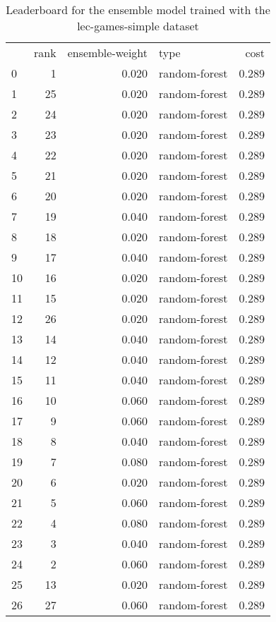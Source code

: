 \begin{table}[]
	\centering
	\begin{tabular}{lrrlr}
		   & rank & ensemble-weight & type          & cost  \\
		0  & 1    & 0.020           & random-forest & 0.289 \\
		1  & 25   & 0.020           & random-forest & 0.289 \\
		2  & 24   & 0.020           & random-forest & 0.289 \\
		3  & 23   & 0.020           & random-forest & 0.289 \\
		4  & 22   & 0.020           & random-forest & 0.289 \\
		5  & 21   & 0.020           & random-forest & 0.289 \\
		6  & 20   & 0.020           & random-forest & 0.289 \\
		7  & 19   & 0.040           & random-forest & 0.289 \\
		8  & 18   & 0.020           & random-forest & 0.289 \\
		9  & 17   & 0.040           & random-forest & 0.289 \\
		10 & 16   & 0.020           & random-forest & 0.289 \\
		11 & 15   & 0.020           & random-forest & 0.289 \\
		12 & 26   & 0.020           & random-forest & 0.289 \\
		13 & 14   & 0.040           & random-forest & 0.289 \\
		14 & 12   & 0.040           & random-forest & 0.289 \\
		15 & 11   & 0.040           & random-forest & 0.289 \\
		16 & 10   & 0.060           & random-forest & 0.289 \\
		17 & 9    & 0.060           & random-forest & 0.289 \\
		18 & 8    & 0.040           & random-forest & 0.289 \\
		19 & 7    & 0.080           & random-forest & 0.289 \\
		20 & 6    & 0.020           & random-forest & 0.289 \\
		21 & 5    & 0.060           & random-forest & 0.289 \\
		22 & 4    & 0.080           & random-forest & 0.289 \\
		23 & 3    & 0.040           & random-forest & 0.289 \\
		24 & 2    & 0.060           & random-forest & 0.289 \\
		25 & 13   & 0.020           & random-forest & 0.289 \\
		26 & 27   & 0.060           & random-forest & 0.289 \\
	\end{tabular}

	\caption{Leaderboard for the ensemble model trained with the lec-games-simple dataset}
	\label{tab:lb-lec-games-simple-randsplit}
\end{table}


